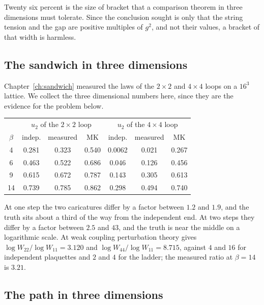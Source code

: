 Twenty six percent is the size of bracket that a comparison theorem in three dimensions must tolerate. Since the conclusion sought is only that the string tension and the gap are positive multiples of $g^2$, and not their values, a bracket of that width is harmless.

\subsection{The sandwich in three dimensions}

Chapter~\ref{ch:sandwich} measured the laws of the $2\times2$ and $4\times4$ loops on a $16^3$ lattice. We collect the three dimensional numbers here, since they are the evidence for the problem below.

\begin{center}
\small
\begin{tabular}{ccccccc}
\toprule
 & \multicolumn{3}{c}{$u_2$ of the $2\times2$ loop} & \multicolumn{3}{c}{$u_2$ of the $4\times4$ loop} \\
$\beta$ & indep. & measured & MK & indep. & measured & MK \\ \midrule
4 & 0.281 & 0.323 & 0.540 & 0.0062 & 0.021 & 0.267 \\
6 & 0.463 & 0.522 & 0.686 & 0.046 & 0.126 & 0.456 \\
9 & 0.615 & 0.672 & 0.787 & 0.143 & 0.305 & 0.613 \\
14 & 0.739 & 0.785 & 0.862 & 0.298 & 0.494 & 0.740 \\
\bottomrule
\end{tabular}
\end{center}

At one step the two caricatures differ by a factor between $1.2$ and $1.9$, and the truth sits about a third of the way from the independent end. At two steps they differ by a factor between $2.5$ and $43$, and the truth is near the middle on a logarithmic scale. At weak coupling perturbation theory gives $\log W_{22}/\log W_{11}=3.120$ and $\log W_{44}/\log W_{11}=8.715$, against $4$ and $16$ for independent plaquettes and $2$ and $4$ for the ladder; the measured ratio at $\beta=14$ is $3.21$.

\subsection{The path in three dimensions}


